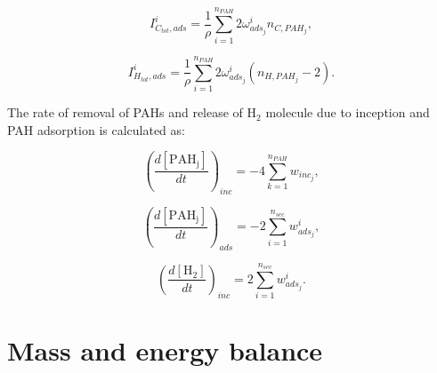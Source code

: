 \begin{equation}
	I^i_{C_{tot},ads} =
	\frac{1}{\rho}
	\sum_{i=1}^{n_{PAH}}
	2\omega^i_{ads_j}
	n_{C,PAH_j}
	\label{eqn:ICtotads_dimcoal},
\end{equation}

\begin{equation}
	I^i_{H_{tot},ads} =
	\frac{1}{\rho}
	\sum_{i=1}^{n_{PAH}}
	2\omega^i_{ads_j}
	\left(n_{H,PAH_j}-2\right)
	\label{eqn:IHtotads_dimcoal}.
\end{equation}

The rate of removal of PAHs and release of $\mathrm{H_2}$ molecule due to inception and PAH adsorption is calculated as:

\begin{equation}
	\left(
	\frac{d\left[{\mathrm{PAH_j}}\right]}{dt}
	\right)_{inc}
	= 
	-4\sum_{k=1}^{n_{PAH}}w_{inc_{j}},
	\label{eqn:PAHscrub_dimcoal_inc}
\end{equation}

\begin{equation}
	\left(
	\frac{d\left[{\mathrm{PAH_j}}\right]}{dt}
	\right)_{ads}
	= 
	-2\sum_{i=1}^{n_{sec}}w^i_{ads_j},
	\label{eqn:PAHscrub_dimcoal_ads}
\end{equation}

\begin{equation}
	\left(
	\frac{d\left[{\mathrm{H_2}}\right]}{dt}
	\right)_{inc}
	= 
	2\sum_{i=1}^{n_{sec}}w^i_{ads_j}
	\label{eqn:H2scrub_dimcoal}.
\end{equation}


\section{Mass and energy balance}

